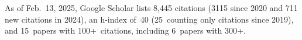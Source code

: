 %
As of Feb.~13, 2025, Google Scholar lists
8,445 citations (3115 since 2020 and 711 new citations in 2024),
an h-index of~40 (25~counting only citations since 2019),
and 15~papers with 100+~citations, including 6~papers with 300+.
